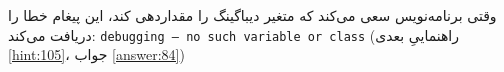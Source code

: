 \section{}
\paragraph{}\label{hint:11}
وقتی برنامه‌نویس سعی می‌کند که متغیر دیباگینگ را مقداردهی کند، این پیغام خطا را دریافت می‌کند:
\LTR
\texttt{debugging – no such variable or class}
\RTL
(راهنماییِ بعدی \ref{hint:105}، جواب \ref{answer:84})